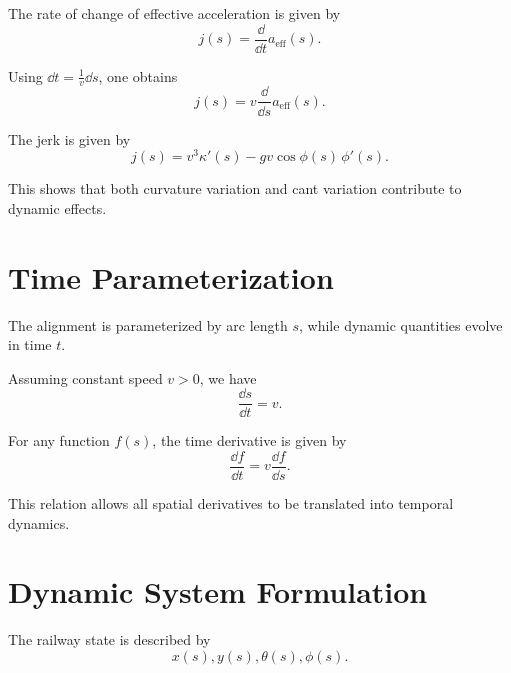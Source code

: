 \begin{definition}[Jerk]
The rate of change of effective acceleration is given by
\[
j(s)
=
\frac{\dd}{\dd t} a_{\mathrm{eff}}(s).
\]
\end{definition}

\begin{remark}
Using $\dd t = \frac{1}{v} \dd s$, one obtains
\[
j(s)
=
v \frac{\dd}{\dd s} a_{\mathrm{eff}}(s).
\]
\end{remark}

\begin{proposition}
The jerk is given by
\[
j(s)
=
v^3 \kappa'(s) - g v \cos\phi(s)\,\phi'(s).
\]
\end{proposition}

\begin{remark}
This shows that both curvature variation and cant variation contribute
to dynamic effects.
\end{remark}

\section{Time Parameterization}

\begin{remark}
The alignment is parameterized by arc length \(s\), while dynamic
quantities evolve in time \(t\).
\end{remark}

\begin{definition}
Assuming constant speed \(v>0\), we have
\[
\frac{\dd s}{\dd t} = v.
\]
\end{definition}

\begin{proposition}
For any function \(f(s)\), the time derivative is given by
\[
\frac{\dd f}{\dd t}
=
v \frac{\dd f}{\dd s}.
\]
\end{proposition}

\begin{remark}
This relation allows all spatial derivatives to be translated into
temporal dynamics.
\end{remark}

\section{Dynamic System Formulation}

\begin{definition}
The railway state is described by
\[
x(s), y(s), \theta(s), \phi(s).
\]
\end{definition}

